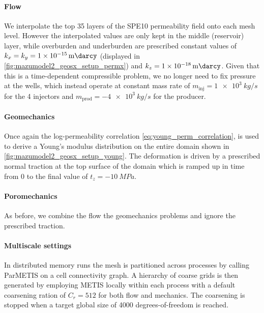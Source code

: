 \paragraph{Flow}
We interpolate the top 35 layers of the SPE10 permeability field onto each mesh level.    However the interpolated values are only kept in the middle (reservoir) layer, while overburden and underburden are prescribed constant values of $k_x = k_y = \qty{1e-15}{\milli\darcy}$ (displayed in \cref{fig:mazumodel2_geosx_setup_permx}) and $k_z = \qty{1e-18}{\milli\darcy}$.    Given that this is a time-dependent compressible problem, we no longer need to fix pressure at the wells, which instead operate at constant mass rate of $m_{\text{inj}} = \qty{1e3}{kg/s}$ for the 4 injectors and $m_{\text{prod}} = -\qty{4e3}{kg/s}$ for the producer.

\paragraph{Geomechanics}
Once again the log-permeability correlation \cref{eq:young_perm_correlation}, is used to derive a Young's modulus distribution on the entire domain shown in \cref{fig:mazumodel2_geosx_setup_young}.   The deformation is driven by a prescribed normal traction at the top surface of the domain which is ramped up in time from 0 to the final value of $t_z = -\qty{10}{MPa}$.

\paragraph{Poromechanics}
As before, we combine the flow the geomechanics problems and ignore the prescribed traction. 

\paragraph{Multiscale settings}
In distributed memory runs the mesh is partitioned across processes by calling ParMETIS on a cell connectivity graph.   A hierarchy of coarse grids is then generated by employing METIS locally within each process with a default coarsening ration of $C_r = 512$ for both flow and mechanics.   The coarsening is stopped when a target global size of 4000 degrees-of-freedom is reached.


